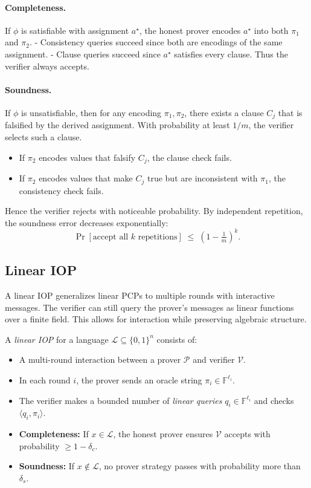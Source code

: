 \paragraph{Completeness.}
If $\phi$ is satisfiable with assignment $a^\star$, the honest prover encodes $a^\star$ into both $\pi_1$ and $\pi_2$.  
- Consistency queries succeed since both are encodings of the same assignment.  
- Clause queries succeed since $a^\star$ satisfies every clause.  
Thus the verifier always accepts.

\paragraph{Soundness.}
If $\phi$ is unsatisfiable, then for any encoding $\pi_1,\pi_2$, there exists a clause $C_j$ that is falsified by the derived assignment. With probability at least $1/m$, the verifier selects such a clause.  
\begin{itemize}
  \item If $\pi_2$ encodes values that falsify $C_j$, the clause check fails.  
  \item If $\pi_2$ encodes values that make $C_j$ true but are inconsistent with $\pi_1$, the consistency check fails.  
\end{itemize}
Hence the verifier rejects with noticeable probability. By independent repetition, the soundness error decreases exponentially:
\[
\Pr[\text{accept all $k$ repetitions}] \;\le\; \left(1-\tfrac{1}{m}\right)^k.
\]

\subsection{Linear IOP}

\noindent A linear IOP generalizes linear PCPs to multiple rounds with interactive messages. The verifier can still query the prover’s messages as linear functions over a finite field. This allows for interaction while preserving algebraic structure.

\begin{definition}
A \emph{linear IOP} for a language $\mathcal{L} \subseteq \{0,1\}^n$ consists of:
\begin{itemize}
    \item A multi-round interaction between a prover $\mathcal{P}$ and verifier $\mathcal{V}$.
    \item In each round $i$, the prover sends an oracle string $\pi_i \in \mathbb{F}^{\ell_i}$.
    \item The verifier makes a bounded number of \emph{linear queries} $q_i \in \mathbb{F}^{\ell_i}$ and checks $\langle q_i, \pi_i \rangle$.
    \item \textbf{Completeness:} If $x \in \mathcal{L}$, the honest prover ensures $\mathcal{V}$ accepts with probability $\ge 1-\delta_c$.
    \item \textbf{Soundness:} If $x \notin \mathcal{L}$, no prover strategy passes with probability more than $\delta_s$.
\end{itemize}
\end{definition}

